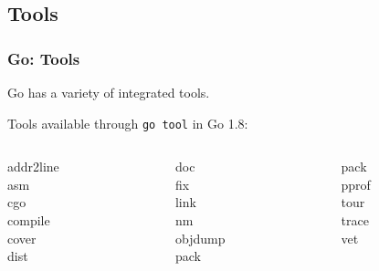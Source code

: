 \subsection{Tools}

\begin{frame}[t]
  \frametitle{Go: Tools}

  Go has a variety of integrated tools.

  \vspace{\baselineskip}
  Tools available through \texttt{go tool} in Go 1.8:

  \begin{center}
    \begin{columns}[T]
      \begin{column}{0.25\textwidth}
        addr2line \\
        asm \\
        cgo \\
        compile \\
        cover \\
        dist
      \end{column}
      \begin{column}{0.25\textwidth}
        doc \\
        fix \\
        link \\
        nm \\
        objdump \\
        pack
      \end{column}
      \begin{column}{0.25\textwidth}
        pack \\
        pprof \\
        tour \\
        trace \\
        vet
      \end{column}
    \end{columns}
  \end{center}


\end{frame}
